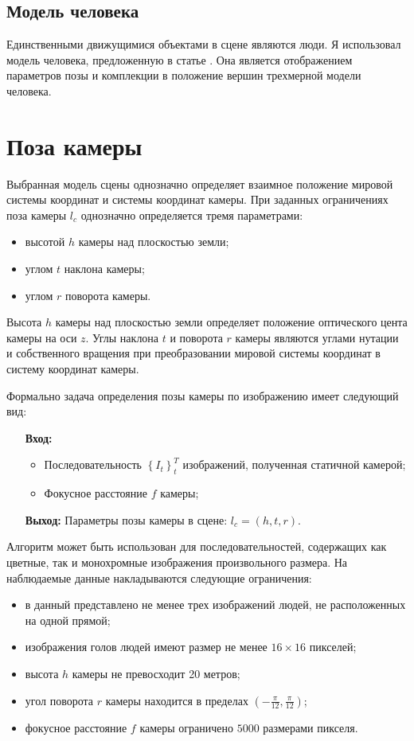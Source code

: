 \subsection{Модель человека}

Единственными движущимися объектами в сцене являются люди. Я использовал модель человека, предложенную в статье \cite{pishchulin15arxiv}. Она является отображением параметров позы и комплекции в положение вершин трехмерной модели человека.

\section{Поза камеры}

Выбранная модель сцены однозначно определяет взаимное положение мировой системы координат и системы координат камеры. При заданных ограничениях поза камеры $l_{c}$ однозначно определяется тремя параметрами:
\begin{itemize}
	\item высотой $h$ камеры над плоскостью земли;
	\item углом $t$ наклона камеры;
	\item углом $r$ поворота камеры.
\end{itemize}

Высота $h$ камеры над плоскостью земли определяет положение оптического цента камеры на оси $z$. Углы наклона $t$ и поворота $r$ камеры являются углами нутации и собственного вращения при преобразовании мировой системы координат в систему координат камеры.

Формально задача определения позы камеры по изображению имеет следующий вид:
\begin{itemize}
\item[\textbf{Вход:}]
\begin{itemize}
\item Последовательность $\left\{I_t\right\}_t^T$ изображений, полученная статичной камерой;
\item Фокусное расстояние $f$ камеры;
\end{itemize}
\item[\textbf{Выход:}] Параметры позы камеры в сцене: $l_{c} = \left( h, t, r \right)$.
\end{itemize}

Алгоритм может быть использован для последовательностей, содержащих  как цветные, так и монохромные изображения произвольного размера. На наблюдаемые данные накладываются следующие ограничения:
\begin{itemize}
	\item в данный представлено не менее трех изображений людей, не расположенных на одной прямой;
	\item изображения голов людей имеют размер не менее $16\times16$ пикселей;
	\item высота $h$ камеры не превосходит 20 метров;
	\item угол поворота $r$ камеры находится в пределах $\left(-\frac{\pi}{12}, \frac{\pi}{12}\right)$;
	\item фокусное расстояние $f$ камеры ограничено $5000$ размерами пикселя.
\end{itemize}


